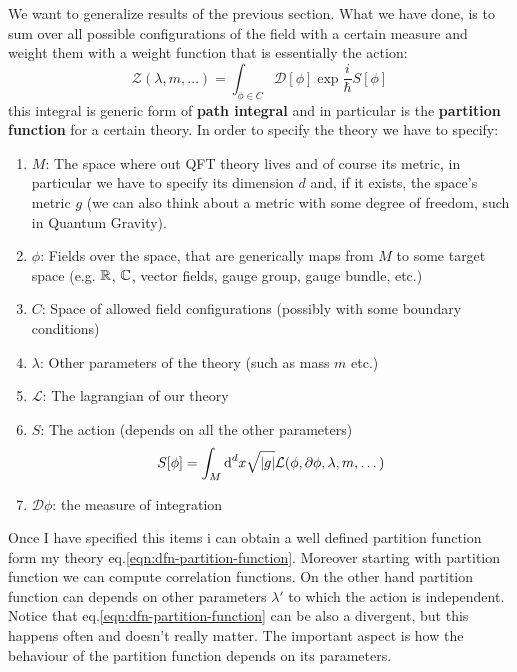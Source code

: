 \documentclass[../main/main.tex]{subfiles}
\begin{document}
We want to generalize results of the previous section. 
What we have done, is to sum over all possible configurations of the field with a certain measure and weight them with a weight function that is essentially the action:
\begin{equation}\label{eqn:dfn-partition-function}\boxed{
\mathcal Z(\lambda, m,\dots)=\int_{\phi\in C}\mathcal  D[\phi]\exp{\frac i\hbar S[\phi]}
}\end{equation}
this integral is generic form of \textbf{path integral} and in particular is the \textbf{partition function} for a certain theory. In order to specify the theory we have to specify:
\begin{enumerate}
\item $M$: The space where out QFT theory lives and of course its metric, in particular we have to specify its dimension $d$ and, if it exists, the space's metric $g$ (we can also think about a metric with some degree of freedom, such in Quantum Gravity).
\item $\phi$: Fields over the space, that are generically maps from $M$ to some target space (e.g. $\mathbb{R}$, $\mathbb{C}$, vector fields, gauge group, gauge bundle, etc.)
\item $C$: Space of allowed field configurations (possibly with some boundary conditions)
\item $\lambda$: Other parameters of the theory (such as mass $m$ etc.)
\item $\mathcal L$: The lagrangian of our theory
\item $S$: The action (depends on all the other parameters)
\[S[\phi]=\int_M\textup{d}^dx\sqrt{|g|}\mathcal L(\phi, \partial \phi, \lambda, m, \dots)\]
\item$\mathcal D\phi$: the measure of integration
\end{enumerate}

Once I have specified this items i can obtain a well defined partition function form my theory eq.\eqref{eqn:dfn-partition-function}. Moreover starting with partition function we can compute correlation functions.
On the other hand partition function can depends on other parameters $\lambda'$ to which the action is independent. Notice that  eq.\eqref{eqn:dfn-partition-function} can be also a divergent, but this happens often and doesn't really matter. The important aspect is how the behaviour of the partition function depends on its parameters. 
\end{document}
